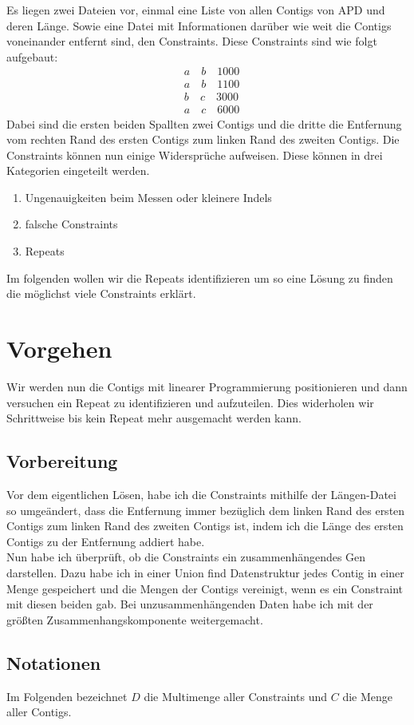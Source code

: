 \documentclass[12pt,ngerman,titlepage,a4paper]{article}
\begin{document}
Es liegen zwei Dateien vor, einmal eine Liste von allen Contigs von APD und deren Länge. Sowie eine Datei mit Informationen darüber wie weit die Contigs voneinander entfernt sind, den Constraints. Diese Constraints sind wie folgt aufgebaut:
\begin{align*}
&a \quad b \quad 1000\\
&a \quad b \quad 1100\\
&b \quad c \quad 3000\\
&a \quad c \quad 6000
\end{align*}
Dabei sind die ersten beiden Spallten zwei Contigs und die dritte die Entfernung vom rechten Rand des ersten Contigs zum linken Rand des zweiten Contigs. Die Constraints können nun einige Widersprüche aufweisen. Diese können in drei Kategorien eingeteilt werden. 
\begin{enumerate}
\item Ungenauigkeiten beim Messen oder kleinere Indels
\item falsche Constraints
\item Repeats
\end{enumerate}
Im folgenden wollen wir die Repeats identifizieren um so eine Lösung zu finden die möglichst viele Constraints erklärt.
\section{Vorgehen}
Wir werden nun die Contigs mit linearer Programmierung positionieren und dann versuchen ein Repeat zu identifizieren und aufzuteilen. Dies widerholen wir Schrittweise bis kein Repeat mehr ausgemacht werden kann.
\subsection{Vorbereitung}
Vor dem eigentlichen Lösen, habe ich die Constraints mithilfe der Längen-Datei so umgeändert, dass die Entfernung immer bezüglich dem linken Rand des ersten Contigs zum linken Rand des zweiten Contigs ist, indem ich die Länge des ersten Contigs zu der Entfernung addiert habe.\\
Nun habe ich überprüft, ob die Constraints ein zusammenhängendes Gen darstellen. Dazu habe ich in einer Union find Datenstruktur jedes Contig in einer Menge gespeichert und die Mengen der Contigs vereinigt, wenn es ein Constraint mit diesen beiden gab.
Bei unzusammenhängenden Daten habe ich mit der größten Zusammenhangskomponente weitergemacht.

\subsection{Notationen}
Im Folgenden bezeichnet $D$ die Multimenge aller Constraints und $C$ die Menge aller Contigs.
\end{document}
